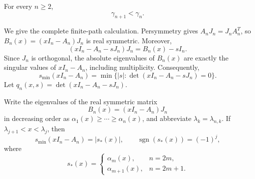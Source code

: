 \documentclass[review,hidelinks,onefignum,onetabnum]{siamart251216}
\begin{document}
\begin{lemma}\label{lem:mesh}
For every \(n\geq2\),
\[
 \gamma_{n+1}<\gamma_n.
\]
\end{lemma}

We give the complete finite-path calculation.  Persymmetry gives
\(A_nJ_n=J_nA_n^T\), so
\(B_n(x)=(xI_n-A_n)J_n\) is real symmetric.  Moreover,
\[
 (xI_n-A_n-sJ_n)J_n=B_n(x)-sI_n.
\]
Since \(J_n\) is orthogonal, the absolute eigenvalues of \(B_n(x)\)
are exactly the singular values of \(xI_n-A_n\), including multiplicity.
Consequently,
\begin{equation}\label{eq:signed-pencil}
 s_{\min}(xI_n-A_n)
 =\min\{|s|:\det(xI_n-A_n-sJ_n)=0\}.
\end{equation}
Let \(q_n(x,s)=\det(xI_n-A_n-sJ_n)\).
\begin{lemma}\label{lem:middle-branch}
Write the eigenvalues of the real symmetric matrix
\[
 B_n(x)=(xI_n-A_n)J_n
\]
in decreasing order as
\(\alpha_1(x)\geq\cdots\geq\alpha_n(x)\), and abbreviate
\(\lambda_k=\lambda_{n,k}\).
If \(\lambda_{j+1}<x<\lambda_j\), then
\[
 s_{\min}(xI_n-A_n)=|s_*(x)|,
 \qquad \operatorname{sgn}(s_*(x))=(-1)^j,
\]
where
\[
 s_*(x)=
 \begin{cases}
  \alpha_m(x),&n=2m,\\
  \alpha_{m+1}(x),&n=2m+1.
 \end{cases}
\]
\end{lemma}
\end{document}
